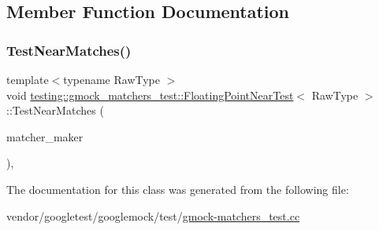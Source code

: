 \subsection{Member Function Documentation}
\mbox{\label{classtesting_1_1gmock__matchers__test_1_1_floating_point_near_test_a712b564197ab76f58d345c5e3e73955d}} 
\subsubsection{\texorpdfstring{Test\+Near\+Matches()}{TestNearMatches()}}
{\footnotesize\ttfamily template$<$typename Raw\+Type $>$ \\
void \hyperlink{classtesting_1_1gmock__matchers__test_1_1_floating_point_near_test}{testing\+::gmock\+\_\+matchers\+\_\+test\+::\+Floating\+Point\+Near\+Test}$<$ Raw\+Type $>$\+::Test\+Near\+Matches (\begin{DoxyParamCaption}\item[{\hyperlink{classtesting_1_1internal_1_1_floating_eq_matcher}{testing\+::internal\+::\+Floating\+Eq\+Matcher}$<$ Raw\+Type $>$($\ast$)(Raw\+Type, Raw\+Type)}]{matcher\+\_\+maker }\end{DoxyParamCaption})\hspace{0.3cm}{\ttfamily [inline]}, {\ttfamily [protected]}}



The documentation for this class was generated from the following file\+:\begin{DoxyCompactItemize}
\item 
vendor/googletest/googlemock/test/\hyperlink{gmock-matchers__test_8cc}{gmock-\/matchers\+\_\+test.\+cc}\end{DoxyCompactItemize}
